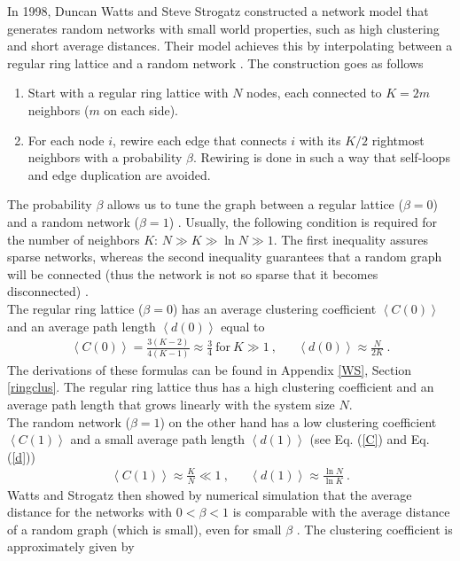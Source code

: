 \documentclass[11 pt , letterpaper , twoside , openright]{book}
\begin{document}
In 1998, Duncan Watts and Steve Strogatz constructed a network model that generates random networks with small world properties, such as high clustering and short average distances. Their model achieves this by interpolating between a regular ring lattice and a random network \cite{Watts1998}. The construction goes as follows \cite{Watts1998}
\begin{enumerate}
	\item Start with a regular ring lattice with $N$ nodes, each connected to $K = 2m$ neighbors ($m$ on each side).
	\item For each node $i$, rewire each edge that connects $i$ with its $K/2$ rightmost neighbors with a probability $\beta$. Rewiring is done in such a way that self-loops and edge duplication are avoided.
\end{enumerate}
The probability $\beta$ allows us to tune the graph between a regular lattice ($\beta = 0$) and a random network ($\beta = 1$) \cite{Watts1998}. Usually, the following condition is required for the number of neighbors $K$: $N \gg K \gg \ln{N} \gg 1$. The first inequality assures sparse networks, whereas the second inequality guarantees that a random graph will be connected (thus the network is not so sparse that it becomes disconnected) \cite{Watts1998}.\\
The regular ring lattice ($\beta=0$) has an average clustering coefficient $\left<C(0)\right>$ and an average path length $\left<d(0)\right>$ equal to \cite{Watts1998}
\begin{align}\label{C0}
	\left<C(0)\right> = \frac{3(K-2)}{4(K-1)} \approx \frac{3}{4} \ \text{for}\ K \gg 1 \ , && \left<d(0)\right> \approx \frac{N}{2K} \ .
\end{align}
The derivations of these formulas can be found in Appendix \ref{WS}, Section \ref{ringclus}. The regular ring lattice thus has a high clustering coefficient and an average path length that grows linearly with the system size $N$. \\
The random network ($\beta = 1$) on the other hand has a low clustering coefficient $\left<C(1)\right>$ and a small average path length $\left<d(1)\right>$ (see Eq. (\ref{C}) and Eq. (\ref{d})) \cite{Watts1998}
\begin{align}
	\left<C(1)\right> \approx \frac{K}{N} \ll 1 \ , && \left<d(1)\right> \approx \frac{\ln{N}}{\ln{K}} \ .
\end{align}
Watts and Strogatz then showed by numerical simulation that the average distance for the networks with $0 < \beta < 1$ is comparable with the average distance of a random graph (which is small), even for small $\beta$ \cite{Newman2000}. The clustering coefficient is approximately given by   \cite{Barrat1999}
\end{document}
